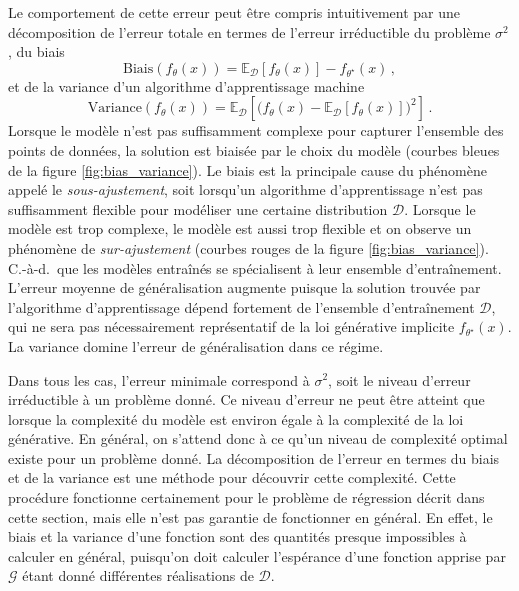 Le comportement de cette erreur 
peut être compris intuitivement par une décomposition de l'erreur totale en termes de l'erreur irréductible du problème 
$\sigma^2$, du biais 
\begin{equation}
        \mathrm{Biais}(f_{\theta}(x)) = \mathbb{E}_{\mathcal{D}}\left[ f_{\theta}(x)\right] - f_{\theta^{\star}}(x)\, ,
\end{equation} 
et de la variance d'un algorithme d'apprentissage machine 
\begin{equation}
       \mathrm{Variance}(f_\theta(x)) = \mathbb{E}_{\mathcal{D}}\left[ \big(f_{\theta}(x) - \mathbb{E}_{\mathcal{D}}\left[f_{\theta}(x) \right] \big)^2 \right]\, .
\end{equation} 
Lorsque le modèle n'est pas suffisamment complexe pour capturer l'ensemble des points de données, la solution est biaisée par le choix du modèle (courbes bleues de la 
figure \ref{fig:bias_variance}). Le biais est la principale cause du phénomène appelé le \textit{sous-ajustement}, soit lorsqu'un algorithme d'apprentissage n'est pas suffisamment 
flexible pour modéliser une certaine distribution $\mathcal{D}$. Lorsque le modèle est trop complexe, 
le modèle est aussi trop flexible et on observe un phénomène de \textit{sur-ajustement} (courbes rouges de la figure \ref{fig:bias_variance}). 
C.-à-d.~que les modèles entraînés se spécialisent à leur ensemble d'entraînement. 
L'erreur moyenne de généralisation augmente puisque la solution trouvée par l'algorithme d'apprentissage dépend fortement de l'ensemble d'entraînement $\mathcal{D}$, 
qui ne sera pas nécessairement représentatif de la loi générative implicite $f_{\theta^{\star}}(x)$. La variance domine l'erreur 
de généralisation dans ce régime.

Dans tous les cas, l'erreur minimale correspond à $\sigma^2$, soit le niveau d'erreur irréductible à un problème donné. 
Ce niveau d'erreur ne peut être atteint que lorsque la complexité du modèle est environ égale à la complexité de la loi 
générative. En général, on s'attend donc à ce qu'un niveau de complexité optimal existe pour un problème donné. 
La décomposition de l'erreur en termes du biais et de la variance est une méthode pour découvrir cette complexité. 
Cette procédure fonctionne certainement pour le problème de régression décrit dans cette section, mais elle n'est pas garantie de fonctionner en général. 
En effet, le biais et la variance d'une fonction sont des quantités presque impossibles à calculer en général, puisqu'on doit calculer l'espérance d'une fonction 
apprise par $\mathcal{G}$ étant donné différentes réalisations de $\mathcal{D}$.

